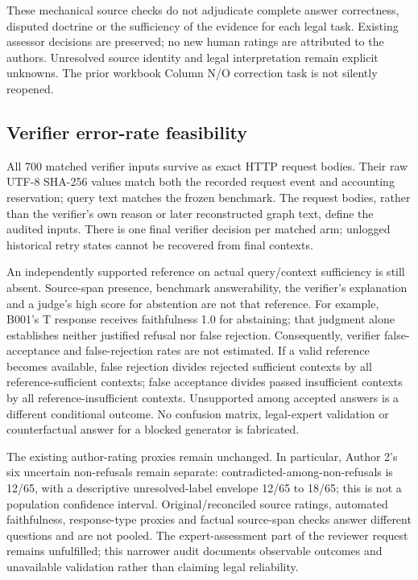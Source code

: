 These mechanical source checks do not adjudicate complete answer correctness, disputed doctrine or the sufficiency of the evidence for each legal task. Existing assessor decisions are preserved; no new human ratings are attributed to the authors. Unresolved source identity and legal interpretation remain explicit unknowns. The prior workbook Column N/O correction task is not silently reopened.

\subsection{Verifier error-rate feasibility}
All 700 matched verifier inputs survive as exact HTTP request bodies. Their raw UTF-8 SHA-256 values match both the recorded request event and accounting reservation; query text matches the frozen benchmark. The request bodies, rather than the verifier's own reason or later reconstructed graph text, define the audited inputs. There is one final verifier decision per matched arm; unlogged historical retry states cannot be recovered from final contexts.

An independently supported reference on actual query/context sufficiency is still absent. Source-span presence, benchmark answerability, the verifier's explanation and a judge's high score for abstention are not that reference. For example, B001's T response receives faithfulness 1.0 for abstaining; that judgment alone establishes neither justified refusal nor false rejection. Consequently, verifier false-acceptance and false-rejection rates are not estimated. If a valid reference becomes available, false rejection divides rejected sufficient contexts by all reference-sufficient contexts; false acceptance divides passed insufficient contexts by all reference-insufficient contexts. Unsupported among accepted answers is a different conditional outcome. No confusion matrix, legal-expert validation or counterfactual answer for a blocked generator is fabricated.

The existing author-rating proxies remain unchanged. In particular, Author 2's six uncertain non-refusals remain separate: contradicted-among-non-refusals is 12/65, with a descriptive unresolved-label envelope 12/65 to 18/65; this is not a population confidence interval. Original/reconciled source ratings, automated faithfulness, response-type proxies and factual source-span checks answer different questions and are not pooled. The expert-assessment part of the reviewer request remains unfulfilled; this narrower audit documents observable outcomes and unavailable validation rather than claiming legal reliability.
